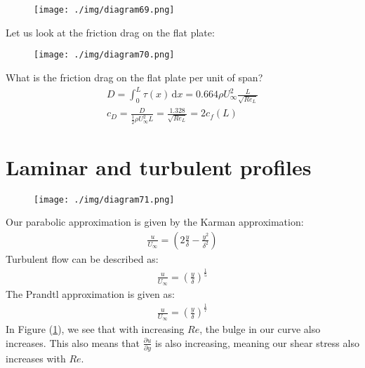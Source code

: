 \begin{figure}[H]
  \centering
  \texttt{[image: ./img/diagram69.png]}
\end{figure}
Let us look at the friction drag on the flat plate:
\begin{figure}[H]
  \centering
  \texttt{[image: ./img/diagram70.png]}
\end{figure}
What is the friction drag on the flat plate per unit of span?
\begin{align}
  D = \int_{0}^{L} \tau(x) \,\mathrm{d}x = 0.664 \rho U_\infty^2 \frac{L}{\sqrt{Re_L}} \\
  c_D = \frac{D}{\frac{1}{2}\rho U_\infty^2 L} = \frac{1.328}{\sqrt{Re_L}} = 2 c_f (L)
\end{align}
\section{Laminar and turbulent profiles}
\begin{figure}[H]
  \centering
  \texttt{[image: ./img/diagram71.png]}
  \label{lamturbpfs}
\end{figure}
Our parabolic approximation is given by the Karman approximation:
\begin{align}
  \frac{u}{U_\infty} = \left( 2 \frac{y}{\delta} - \frac{y^2}{\delta^2}\right)
\end{align}
Turbulent flow can be described as:
\begin{align}
  \frac{u}{U_\infty} = \left(\frac{y}{\delta}\right)^{\frac{1}{5}}
\end{align}
The Prandtl approximation is given as:
\begin{align}
  \frac{u}{U_\infty} = \left(\frac{y}{\delta}\right)^{\frac{1}{7}}
\end{align}
In Figure (\ref{lamturbpfs}), we see that with increasing $Re$, the bulge in our curve also increases. This also means that $\frac{\partial u}{\partial y}$ is also increasing, meaning our shear stress also increases with $Re$.
